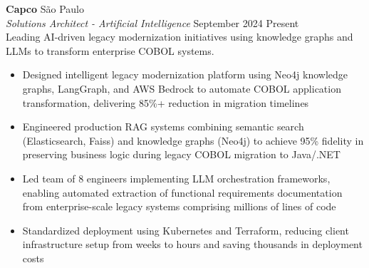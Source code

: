 \documentclass[a4paper]{article}
\begin{document}
\textbf{Capco}                                                      \hfill São Paulo              \\
\textit{Solutions Architect - Artificial Intelligence}               \hfill September 2024 \raisebox{0.2ex}{\scalebox{0.8}{$\sim$}} Present    \\
\vspace{0.5mm}
Leading AI-driven legacy modernization initiatives using knowledge graphs and LLMs to transform enterprise COBOL systems.
\vspace{-2mm}
\begin{itemize}
\setlength\itemsep{-1mm}
\item Designed intelligent legacy modernization platform using Neo4j knowledge graphs, LangGraph, and AWS Bedrock to automate COBOL application transformation, delivering 85\%+ reduction in migration timelines
\item Engineered production RAG systems combining semantic search (Elasticsearch, Faiss) and knowledge graphs (Neo4j) to achieve 95\% fidelity in preserving business logic during legacy COBOL migration to Java/.NET
\item Led team of 8 engineers implementing LLM orchestration frameworks, enabling automated extraction of functional requirements documentation from enterprise-scale legacy systems comprising millions of lines of code
\item Standardized deployment using Kubernetes and Terraform, reducing client infrastructure setup from weeks to hours and saving thousands in deployment costs
\end{itemize}
\end{document}
